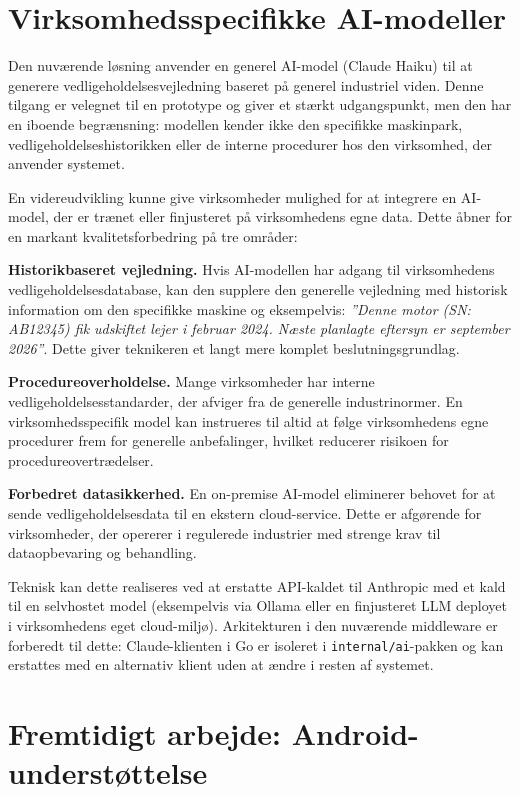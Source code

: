 \section{Virksomhedsspecifikke AI-modeller}
\label{sec:custom-ai}

Den nuværende løsning anvender en generel AI-model (Claude Haiku) til at generere vedligeholdelsesvejledning baseret på generel industriel viden. Denne tilgang er velegnet til en prototype og giver et stærkt udgangspunkt, men den har en iboende begrænsning: modellen kender ikke den specifikke maskinpark, vedligeholdelseshistorikken eller de interne procedurer hos den virksomhed, der anvender systemet.

En videreudvikling kunne give virksomheder mulighed for at integrere en AI-model, der er trænet eller finjusteret på virksomhedens egne data. Dette åbner for en markant kvalitetsforbedring på tre områder:

\textbf{Historikbaseret vejledning.} Hvis AI-modellen har adgang til virksomhedens vedligeholdelsesdatabase, kan den supplere den generelle vejledning med historisk information om den specifikke maskine og eksempelvis: \textit{''Denne motor (SN: AB12345) fik udskiftet lejer i februar 2024. Næste planlagte eftersyn er september 2026''}. Dette giver teknikeren et langt mere komplet beslutningsgrundlag.

\textbf{Procedureoverholdelse.} Mange virksomheder har interne vedligeholdelsesstandarder, der afviger fra de generelle industrinormer. En virksomhedsspecifik model kan instrueres til altid at følge virksomhedens egne procedurer frem for generelle anbefalinger, hvilket reducerer risikoen for procedureovertrædelser.

\textbf{Forbedret datasikkerhed.} En on-premise AI-model eliminerer behovet for at sende vedligeholdelsesdata til en ekstern cloud-service. Dette er afgørende for virksomheder, der opererer i regulerede industrier med strenge krav til dataopbevaring og behandling.

Teknisk kan dette realiseres ved at erstatte API-kaldet til Anthropic med et kald til en selvhostet model (eksempelvis via Ollama eller en finjusteret LLM deployet i virksomhedens eget cloud-miljø). Arkitekturen i den nuværende middleware er forberedt til dette: Claude-klienten i Go er isoleret i \texttt{internal/ai}-pakken og kan erstattes med en alternativ klient uden at ændre i resten af systemet.

\section{Fremtidigt arbejde: Android-understøttelse}
\label{sec:android}

